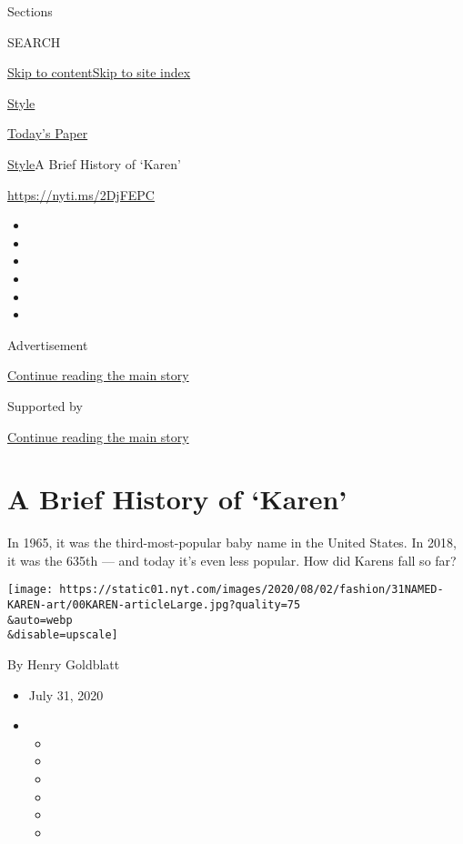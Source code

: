 Sections

SEARCH

\protect\hyperlink{site-content}{Skip to
content}\protect\hyperlink{site-index}{Skip to site index}

\href{https://www.nytimes.com/section/style}{Style}

\href{https://myaccount.nytimes.com/auth/login?response_type=cookie\&client_id=vi}{}

\href{https://www.nytimes.com/section/todayspaper}{Today's Paper}

\href{/section/style}{Style}\textbar{}A Brief History of `Karen'

\url{https://nyti.ms/2DjFEPC}

\begin{itemize}
\item
\item
\item
\item
\item
\item
\end{itemize}

Advertisement

\protect\hyperlink{after-top}{Continue reading the main story}

Supported by

\protect\hyperlink{after-sponsor}{Continue reading the main story}

\hypertarget{a-brief-history-of-karen}{%
\section{A Brief History of `Karen'}\label{a-brief-history-of-karen}}

In 1965, it was the third-most-popular baby name in the United States.
In 2018, it was the 635th --- and today it's even less popular. How did
Karens fall so far?

\texttt{[image: https://static01.nyt.com/images/2020/08/02/fashion/31NAMED-KAREN-art/00KAREN-articleLarge.jpg?quality=75\\\&auto=webp\\\&disable=upscale]}

By Henry Goldblatt

\begin{itemize}
\item
  July 31, 2020
\item
  \begin{itemize}
  \item
  \item
  \item
  \item
  \item
  \item
  \end{itemize}
\end{itemize}

